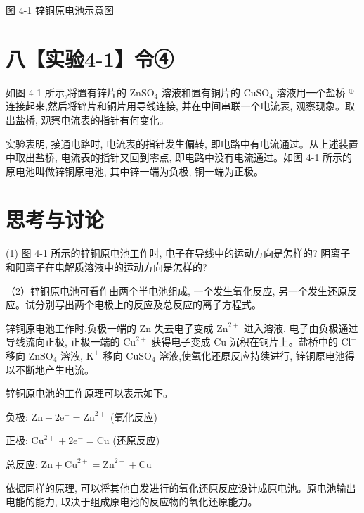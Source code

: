 \documentclass[10pt]{article}
\begin{document}
图 4-1 锌铜原电池示意图

\section*{八【实验4-1】令④}

如图 4-1 所示,将置有锌片的 \({\mathrm{{ZnSO}}}_{4}\) 溶液和置有铜片的 \({\mathrm{{CuSO}}}_{4}\) 溶液用一个盐桥 \({}^{ \oplus }\) 连接起来,然后将锌片和铜片用导线连接, 并在中间串联一个电流表, 观察现象。取出盐桥, 观察电流表的指针有何变化。

实验表明, 接通电路时, 电流表的指针发生偏转, 即电路中有电流通过。从上述装置中取出盐桥, 电流表的指针又回到零点, 即电路中没有电流通过。如图 4-1 所示的原电池叫做锌铜原电池, 其中锌一端为负极, 铜一端为正极。

\section*{思考与讨论}

(1) 图 4-1 所示的锌铜原电池工作时, 电子在导线中的运动方向是怎样的? 阴离子和阳离子在电解质溶液中的运动方向是怎样的?


（2）锌铜原电池可看作由两个半电池组成, 一个发生氧化反应, 另一个发生还原反应。试分别写出两个电极上的反应及总反应的离子方程式。

锌铜原电池工作时,负极一端的 \(\mathrm{{Zn}}\) 失去电子变成 \({\mathrm{{Zn}}}^{2 + }\) 进入溶液, 电子由负极通过导线流向正极, 正极一端的 \({\mathrm{{Cu}}}^{2 + }\) 获得电子变成 \(\mathrm{{Cu}}\) 沉积在铜片上。盐桥中的 \({\mathrm{{Cl}}}^{ - }\) 移向 \({\mathrm{{ZnSO}}}_{4}\) 溶液, \({\mathrm{K}}^{ + }\) 移向 \({\mathrm{{CuSO}}}_{4}\) 溶液,使氧化还原反应持续进行, 锌铜原电池得以不断地产生电流。

锌铜原电池的工作原理可以表示如下。

负极: \(\mathrm{{Zn}} - 2{\mathrm{e}}^{ - } = {\mathrm{{Zn}}}^{2 + }\) (氧化反应)

正极: \({\mathrm{{Cu}}}^{2 + } + 2{\mathrm{e}}^{ - } = \mathrm{{Cu}}\) (还原反应)

总反应: \(\mathrm{{Zn}} + {\mathrm{{Cu}}}^{2 + } = {\mathrm{{Zn}}}^{2 + } + \mathrm{{Cu}}\)

依据同样的原理, 可以将其他自发进行的氧化还原反应设计成原电池。原电池输出电能的能力, 取决于组成原电池的反应物的氧化还原能力。
\end{document}
